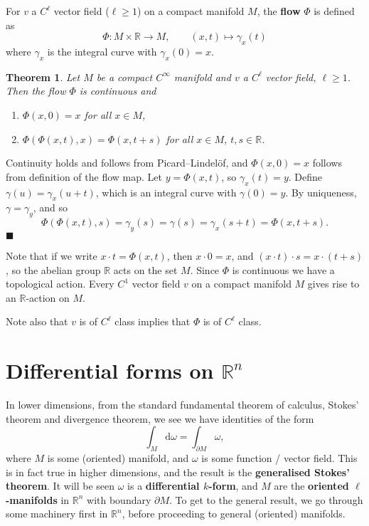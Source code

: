 \documentclass[letter-paper]{tufte-book}
\newtheorem{theorem}{\color{pastel-blue}Theorem}[section]
\newenvironment{proof}[1][Proof]{\begin{trivlist}
\item[\hskip \labelsep {\bfseries #1}]}{\end{trivlist}}
\newcommand{\qed}{\hfill$\blacksquare$}
\begin{document}
For $v$ a $C^\ell$ vector field ($\ell \geq 1$) on a compact manifold $M$, the
\textbf{flow} $\Phi$ is defined as
\begin{equation}
  \Phi : M \times \mathbb{R} \to M, \qquad (x, t) \mapsto \gamma_x(t)
\end{equation}
where $\gamma_x$ is the integral curve with $\gamma_x(0) = x$.

\begin{theorem}
  Let $M$ be a compact $C^\infty$ manifold and $v$ a $C^\ell$ vector field,
  $\ell \geq 1$. Then the flow $\Phi$ is continuous and
  \begin{enumerate}
    \item $\Phi(x, 0) = x$ for all $x \in M$,
    \item $\Phi(\Phi(x, t), x) = \Phi(x, t+s)$ for all $x\in M$, $t,s \in \mathbb{R}$.
  \end{enumerate}
\end{theorem}

\begin{proof}
  Continuity holds and follows from Picard--Lindel\"of, and $\Phi(x,0) = x$
  follows from definition of the flow map. Let $y = \Phi(x, t)$, so $\gamma_x(t)
  = y$. Define $\gamma(u) = \gamma_x(u+t)$, which is an integral curve with
  $\gamma(0) = y$. By uniqueness, $\gamma = \gamma_y$, and so
  \begin{equation*}
    \Phi(\Phi(x, t), s) = \gamma_y(s) = \gamma(s) = \gamma_x(s+t) = \Phi(x, t+s).
  \end{equation*}
  \qed
\end{proof}

Note that if we write $x\cdot t = \Phi(x,t)$, then $x\cdot 0 =x$, and $(x\cdot
t)\cdot s = x\cdot (t+s)$, so the abelian group $\mathbb{R}$ acts on the set
$M$. Since $\Phi$ is continuous we have a topological action. Every $C^1$ vector
field $v$ on a compact manifold $M$ gives rise to an $\mathbb{R}$-action on $M$.

Note also that $v$ is of $C^\ell$ class implies that $\Phi$ is of $C^\ell$
class.


\chapter{Differential forms on $\mathbb{R}^n$}

In lower dimensions, from the standard fundamental theorem of calculus, Stokes'
theorem and divergence theorem, we see we have identities of the form
\begin{equation}
  \int_M \mathrm{d}\omega = \int_{\partial M} \omega,
\end{equation}
where $M$ is some (oriented) manifold, and $\omega$ is some function / vector
field. This is in fact true in higher dimensions, and the result is the
\textbf{generalised Stokes' theorem}. It will be seen $\omega$ is a
\textbf{differential $k$-form}, and $M$ are the \textbf{oriented
$\ell$-manifolds} in $\mathbb{R}^n$ with boundary $\partial M$. To get to the
general result, we go through some machinery first in $\mathbb{R}^n$, before
proceeding to general (oriented) manifolds.
\end{document}
